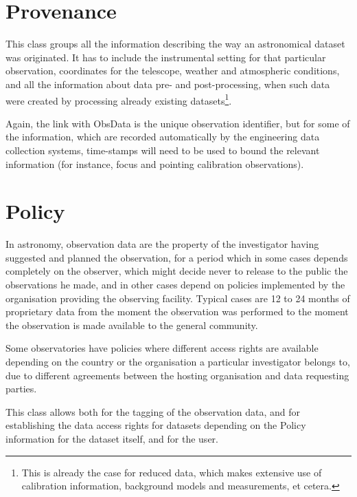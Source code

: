 	
	\section{Provenance} %
		
		This class groups all the information describing the way
		an astronomical dataset was originated.
		It has to include the instrumental
		setting for that particular observation, coordinates for
		the telescope, weather and atmospheric conditions, and all
		the information about data pre- and post-processing,
		when such data were created by processing already existing
		datasets\footnote{This is already the case for reduced data,
		which makes extensive use of calibration information,
		background models and measurements, et cetera.}.
		
		Again, the link with ObsData is the unique observation
		identifier, but for some of the information, which are
		recorded automatically by the engineering data collection
		systems, time-stamps will need to be used to bound the
		relevant information (for instance, focus and pointing
		calibration observations).
		
	
	\section{Policy} %
		
		In astronomy, observation data are the property of the
		investigator having suggested and planned the observation,
		for a period which in some cases depends completely on the
		observer, which might decide never to release to the public
		the observations he made, and in other cases depend on
		policies implemented by the organisation providing the
		observing facility. Typical cases are 12 to 24 months of
		proprietary data from the moment the observation was
		performed to the moment the observation is made available
		to the general community.
		
		Some observatories have policies where different access
		rights are available depending on the country or the
		organisation a particular investigator belongs to, due
		to different agreements between the hosting organisation
		and data requesting parties.
		
		This class allows both for the tagging of the observation
		data, and for establishing the data access rights for 
		datasets depending on the Policy information for the 
		dataset itself, and for the user.
		
